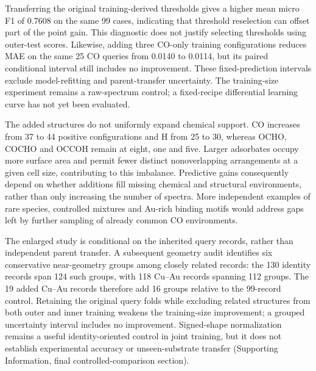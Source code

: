 \documentclass[11pt,a4paper]{article}
\begin{document}
Transferring the original training-derived thresholds gives a higher mean micro F1 of 0.7608 on the same 99 cases, indicating that threshold reselection can offset part of the point gain. This diagnostic does not justify selecting thresholds using outer-test scores. Likewise, adding three CO-only training configurations reduces MAE on the same 25 CO queries from 0.0140 to 0.0114, but its paired conditional interval still includes no improvement. These fixed-prediction intervals exclude model-refitting and parent-transfer uncertainty. The training-size experiment remains a raw-spectrum control; a fixed-recipe differential learning curve has not yet been evaluated.

The added structures do not uniformly expand chemical support. CO increases from 37 to 44 positive configurations and H from 25 to 30, whereas OCHO, COCHO and OCCOH remain at eight, one and five. Larger adsorbates occupy more surface area and permit fewer distinct nonoverlapping arrangements at a given cell size, contributing to this imbalance. Predictive gains consequently depend on whether additions fill missing chemical and structural environments, rather than only increasing the number of spectra. More independent examples of rare species, controlled mixtures and Au-rich binding motifs would address gaps left by further sampling of already common CO environments.

The enlarged study is conditional on the inherited query records, rather than independent parent transfer. A subsequent geometry audit identifies six conservative near-geometry groups among closely related records: the 130 identity records span 124 such groups, with 118 Cu--Au records spanning 112 groups. The 19 added Cu--Au records therefore add 16 groups relative to the 99-record control. Retaining the original query folds while excluding related structures from both outer and inner training weakens the training-size improvement; a grouped uncertainty interval includes no improvement. Signed-shape normalization remains a useful identity-oriented control in joint training, but it does not establish experimental accuracy or unseen-substrate transfer (Supporting Information, final controlled-comparison section).
\end{document}

